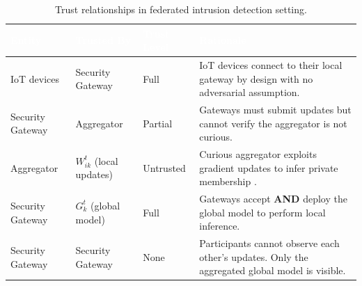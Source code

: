 \documentclass[letterpaper]{article}
\begin{document}
\vspace{1em}
\renewcommand{\arraystretch}{1.5}
\begin{table}[h!]
\centering
\begin{tabularx}{\textwidth}{|
    >{\raggedright\arraybackslash}p{}|
    >{\raggedright\arraybackslash}p{}|
    >{\raggedright\arraybackslash}p{}|
    >{\raggedright\arraybackslash}X|}
\hline
\rowcolor{black}
\centering\arraybackslash\textcolor{white}{\textbf{Entity}} &
\centering\arraybackslash\textcolor{white}{\textbf{Trusted By}} &
\centering\arraybackslash\textcolor{white}{\textbf{Trust Level}} &
\centering\arraybackslash\textcolor{white}{\textbf{Rationale}} \\
\hline

IoT devices &
Security Gateway &
Full &
IoT devices connect to their local gateway by design with no adversarial assumption. \\
\hline

Security Gateway &
Aggregator &
Partial &
Gateways must submit updates but cannot verify the aggregator is not curious. \\
\hline

Aggregator &
$W_{ik}^{t}$ (local updates) &
Untrusted &
Curious aggregator exploits gradient updates to infer private membership \cite{nasr2019}. \\
\hline

Security Gateway &
$G_{k}^{t}$ (global model) &
Full &
Gateways accept \textbf{AND} deploy the global model to perform local inference. \\
\hline

Security Gateway &
Security Gateway &
None &
Participants cannot observe each other’s updates. Only the aggregated global model is visible. \\
\hline
\end{tabularx}
\caption{Trust relationships in federated intrusion detection setting.}
\label{tab:trust-model}
\end{table}

\pagebreak
\end{document}
